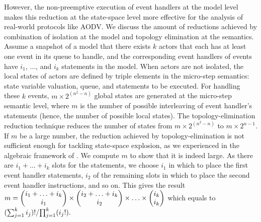 However, the non-preemptive execution of event handlers at the model level makes this reduction at the state-space level more effective for the analysis of real-world protocols like AODV. We discuss the amount of reductions achieved by combination of isolation at the model and topology elimination at the semantics. Assume a snapshot of a model that there exists $k$ actors that each has at least one event in its queue to handle, and the corresponding event handlers of events have $i_1$, $\ldots$, and $i_k$ statements in the model. When actors are not isolated, the local states of actors are defined by triple elements in the micro-step semantics: state variable valuation, queue, and statements to be executed. For handling these $k$ events, $m\times 2^{(n^2-n)}$ global states are generated at the micro-step semantic level, where $m$ is the number of possible interleaving of event handler's statements (hence, the number of possible local states). The topology-elimination reduction technique reduces the number of states from $m\times 2^{(n^2-n)}$ to $m\times2^{n-1}$. If $m$ be a large number, the reduction achieved by topology-elimination is not sufficient enough for tackling state-space explosion, as we experienced in the algebraic framework of \cite{FOAC}.  %
We compute $m$ to show that it is indeed large. As there are $i_1+\ldots+i_k$ slots for the statements, we choose $i_1$ in which to place the first event handler statements, $i_2$ of the remaining slots in which to place the second event handler instructions, and so on. This gives the result  ${\small m=\begin{pmatrix}
	i_1+\ldots+i_k\\
	i_1 \\
	\end{pmatrix}\times
	\begin{pmatrix}
	i_2+\ldots+i_k\\
	i_2 \\
	\end{pmatrix}\times	\ldots\times
	\begin{pmatrix}
	i_k\\
	i_k \\
	\end{pmatrix}}$ which equals to ${\small %
{(\sum_{j=1}^{k} i_j)!}/{\prod_{j=1}^{k}(i_j!)}.}$%
